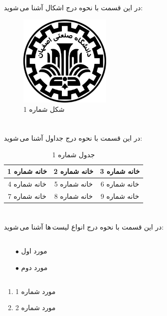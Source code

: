 \documentclass{article}
\begin{document}
\section{}
در این قسمت با نحوه درج اشکال آشنا می\,شوید:
\begin{figure}[ht]
    \centering
    \includegraphics[width=0.4\textwidth]{IUT Logo.png}
    \caption{شکل شماره 1}
    \label{fig:fig1}
\end{figure}

\section{}
در این قسمت با نحوه درج جداول آشنا می\,شوید:
\begin{table}[ht]
    \centering
    \begin{tabular}{|c|c|c|}
    \hline
    خانه شماره 1 & خانه شماره 2 & خانه شماره 3\\
    \hline
    خانه شماره 4 & خانه شماره 5 & خانه شماره 6\\
    \hline
    خانه شماره 7 & خانه شماره 8 & خانه شماره 9\\
    \hline
    \end{tabular}
    \caption{جدول شماره 1}
    \label{tab:tab1}
\end{table}

\section{}
در این قسمت با نحوه درج انواع لیست\,ها آشنا می\,شوید:
\subsection{}
\begin{itemize}
    \item [$\bullet$] مورد اول
    \item [$\bullet$] مورد دوم
\end{itemize}
\subsection{}
\begin{enumerate}
    \item مورد شماره 1
    \item مورد شماره 2
\end{enumerate}
\end{document}
